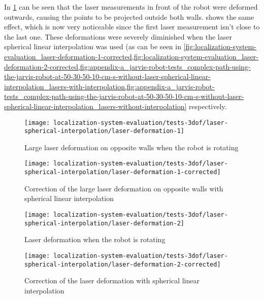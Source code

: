 In \cref{fig:localization-system-evaluation_laser-deformation-1} can be seen that the laser measurements in front of the robot were deformed outwards, causing the points to be projected outside both walls.  shows the same effect, which is now very noticeable since the first laser measurement isn't close to the last one. These deformations were severely diminished when the laser spherical linear interpolation was used (as can be seen in \cref{fig:localization-system-evaluation_laser-deformation-1-corrected,fig:localization-system-evaluation_laser-deformation-2-corrected,fig:appendix-a_jarvis-robot-tests_complex-path-using-the-jarvis-robot-at-50-30-50-10-cm-s-without-laser-spherical-linear-interpolation_lasers-with-interpolation,fig:appendix-a_jarvis-robot-tests_complex-path-using-the-jarvis-robot-at-50-30-50-10-cm-s-without-laser-spherical-linear-interpolation_lasers-without-interpolation} respectively.


\begin{figure}[H]
	\centering
	\texttt{[image: localization-system-evaluation/tests-3dof/laser-spherical-interpolation/laser-deformation-1]}
	\caption{Large laser deformation on opposite walls when the robot is rotating}
	\label{fig:localization-system-evaluation_laser-deformation-1}
\end{figure}

\begin{figure}[H]
	\centering
	\texttt{[image: localization-system-evaluation/tests-3dof/laser-spherical-interpolation/laser-deformation-1-corrected]}
	\caption{Correction of the large laser deformation on opposite walls with spherical linear interpolation}
	\label{fig:localization-system-evaluation_laser-deformation-1-corrected}
\end{figure}


\begin{figure}[H]
	\centering
	\texttt{[image: localization-system-evaluation/tests-3dof/laser-spherical-interpolation/laser-deformation-2]}
	\caption{Laser deformation when the robot is rotating}
	\label{fig:localization-system-evaluation_laser-deformation-2}
\end{figure}

\begin{figure}[H]
	\centering
	\texttt{[image: localization-system-evaluation/tests-3dof/laser-spherical-interpolation/laser-deformation-2-corrected]}
	\caption{Correction of the laser deformation with spherical linear interpolation}
	\label{fig:localization-system-evaluation_laser-deformation-2-corrected}
\end{figure}



